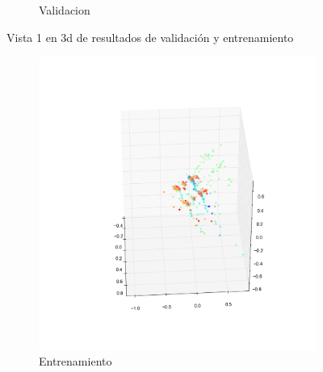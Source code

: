 \begin{figure}[H]
\begin{subfigure}[b]{0.5\textwidth}
                \caption{Validacion}
                \label{fig: ej1_oja_3d_1_valid}
        \end{subfigure}
        \caption{Vista 1 en 3d de resultados de validación y entrenamiento}
        \label{fig: ej1_oja_3d_1}
\end{figure}

\begin{figure}[H]
        \begin{subfigure}[b]{0.5\textwidth}
                \includegraphics[width=\linewidth]{secciones/graficos/oja/2_train.png}
                \caption{Entrenamiento}
                \label{fig: ej1_oja_3d_2_train}
        \end{subfigure}%
        \begin{subfigure}[b]{0.5\textwidth}

\end{subfigure}
\end{figure}
